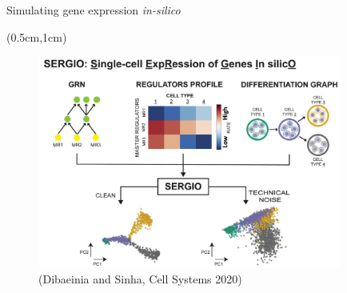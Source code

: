 \documentclass[aspectratio=1610]{beamer}					%
\begin{document}
\begin{frame}{Simulating gene expression \emph{in-silico}}
\begin{textblock*}{15cm}(0.5cm,1cm)
\begin{figure}
\includegraphics[width=10cm]{sergio.png}
\caption{(Dibaeinia and Sinha, Cell Systems 2020)}
\end{figure}
\end{textblock*}
\end{frame}
\end{document}
